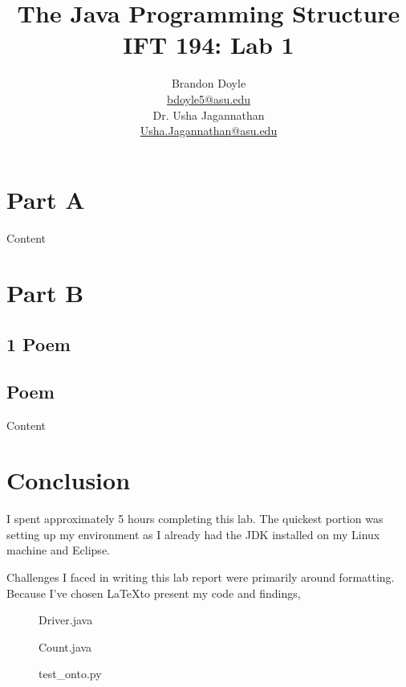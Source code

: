 \documentclass[leqno, 11pt]{article}
\title{\vspace{6ex}The Java Programming Structure\\
  \Large IFT 194: Lab 1}
\author{Brandon Doyle\\
\href{mailto:bdoyle@asu.edu}{bdoyle5\mbox{}{\fontfamily{ptm}\selectfont @}\mbox{}asu.edu}\\[1em]
Dr. Usha Jagannathan\\
\href{mailto:Usha.Jagannathan@asu.edu}{Usha.Jagannathan\mbox{}{\fontfamily{ptm}\selectfont @}\mbox{}asu.edu}}
\begin{document}
\begin{titlepage}
\clearpage\maketitle
\thispagestyle{empty}
\end{titlepage}

\section*{Part A}
Content
\section*{Part B}
\subsection*{1 Poem}
\setcounter{subsection}{1}
\subsection{Poem}
Content
\section*{Conclusion}
I spent approximately 5 hours completing this lab. The quickest portion was
setting up my environment as I already had the JDK installed on my Linux 
machine and Eclipse.

Challenges I faced in writing this lab report were primarily around formatting.
Because I've chosen \LaTeX to present my code and findings, 
\newpage
\begin{figure}[t!]
  \centering
  
  \caption{Driver.java}
  \label{fig:one}
\end{figure}

\begin{figure}
  \centering
  
  \caption{Count.java}
  \label{fig:two}
\end{figure}

\begin{figure}
  \centering
  
  \caption{test\_onto.py}
  \label{fig:three}
\end{figure}
\end{document}
